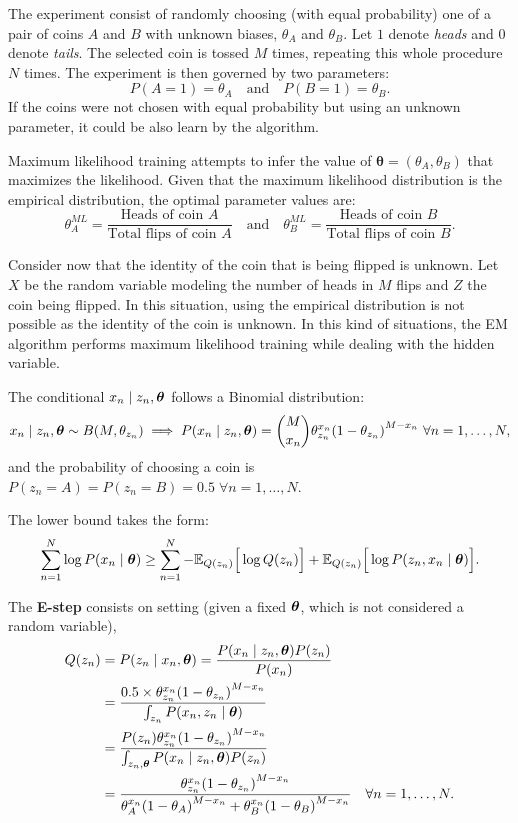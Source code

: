 The experiment consist of randomly choosing (with equal probability) one of a pair of coins \(A\) and \(B\) with unknown biases, \(\theta_{A}\)  and \(\theta_{B}\). Let \(1\) denote \textit{heads} and \(0\) denote \textit{tails}. The selected coin is tossed \(M\)  times, repeating this whole procedure \(N\)  times. The experiment is then governed by two parameters:
\[
  P(A = 1) = \theta_{A} \quad \text{and} \quad P(B = 1) = \theta_{B}.
\]
If the coins were not chosen with equal probability but using an unknown parameter, it could be also learn by the algorithm.

Maximum likelihood training attempts to infer the value of \(\bm{\theta} = (\theta_{A}, \theta_{B})\) that maximizes the likelihood. Given that the maximum likelihood distribution is the empirical distribution, the optimal parameter values are:
\[
  \theta_{A}^{ML} = \frac{\text{Heads of coin }A}{\text{Total flips of coin }A} \quad \text{and} \quad \theta_{B}^{ML} = \frac{\text{Heads of coin }B}{\text{Total flips of coin }B}.
\]

Consider now that the identity of the coin that is being flipped is unknown. Let \(X\) be the random variable modeling the number of heads in \(M\) flips and \(Z\) the coin being flipped. In this situation, using the empirical distribution is not possible as the identity of the coin is unknown. In this kind of situations, the EM algorithm performs maximum likelihood training while dealing with the hidden variable.


The conditional \(x_{n} \mid z_{n}, \bm{\theta}\) follows a Binomial distribution:
\[
  x_{n} \mid z_{n}, \btheta \sim B(M, \theta_{z_{n}}) \implies P(x_{n} \mid z_{n}, \btheta) = \binom{M}{x_{n}}\theta_{z_{n}}^{x_{n}}{(1-\theta_{z_{n}})}^{M - x_{n}} \ \forall n =1,\dots,N,
\]
and the probability of choosing a coin is \(P(z_{n}=A) = P(z_{n}=B)=0.5 \; \forall n =1,\dots,N\).

The lower bound takes the form:
\[
  \sum_{n=1}^{N}\log{P(x_{n} \mid \bm{\theta})} \geq \sum_{n=1}^{N}-\mathbb{E}_{Q(z_{n})}\Big[\log{Q(z_{n})}\Big] + \mathbb{E}_{Q(z_{n})}\Big[\log{P(z_{n}, x_{n} \mid \bm{\theta})}\Big].
\]

The \textbf{E-step} consists on setting (given a fixed \(\bm{\theta}\), which is not considered a random variable),
\[
  \begin{aligned}
    Q(z_{n}) &= P(z_{n} \mid x_{n}, \bm{\theta}) = \frac{P(x_{n} \mid z_{n}, \bm{\theta})P(z_{n})}{P(x_{n})} \\
    &= \frac{0.5 \times \theta_{z_{n}}^{x_{n}}{(1-\theta_{z_{n}})}^{M - x_{n}}}{\int_{z_{n}}P(x_{n},z_{n}\mid \bm{\theta})}\\
    &= \frac{P(z_{n})\theta_{z_{n}}^{x_{n}}{(1-\theta_{z_{n}})}^{M - x_{n}}}{\int_{z_{n}, \bm{\theta}}P(x_{n}\mid z_{n}, \bm{\theta})P(z_{n})}\\
    &= \frac{\theta_{z_{n}}^{x_{n}}{(1-\theta_{z_{n}})}^{M - x_{n}}}{  \theta_{A}^{x_{n}}{(1-\theta_{A})}^{M - x_{n}} + \theta_{B}^{x_{n}}{(1-\theta_{B})}^{M - x_{n}}} \quad \forall n=1,\dots,N.
  \end{aligned}
\]

